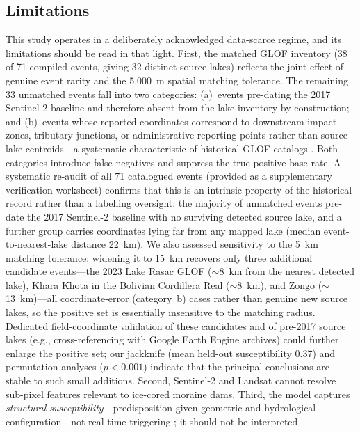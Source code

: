 \documentclass[pdflatex,sn-basic]{sn-jnl}%
\begin{document}
\subsection{Limitations}\label{sec:limitations}

This study operates in a deliberately acknowledged data-scarce regime,
and its limitations should be read in that light. First, the matched
GLOF inventory (38 of 71 compiled events, giving 32 distinct source
lakes) reflects the joint effect of genuine event rarity and the
5{,}000~m spatial matching tolerance. The remaining 33 unmatched events
fall into two categories: (a)~events pre-dating the 2017 Sentinel-2
baseline and therefore absent from the lake inventory by construction;
and (b)~events whose reported coordinates correspond to downstream
impact zones, tributary junctions, or administrative reporting points
rather than source-lake centroids---a systematic characteristic of
historical GLOF catalogs \citep{Lutzow2023,Allen2022}. Both categories
introduce false negatives and suppress the true positive base rate.
A systematic re-audit of all 71 catalogued events (provided as a
supplementary verification worksheet) confirms that this is an intrinsic
property of the historical record rather than a labelling oversight: the
majority of unmatched events pre-date the 2017 Sentinel-2 baseline with
no surviving detected source lake, and a further group carries
coordinates lying far from any mapped lake (median event-to-nearest-lake
distance 22~km). We also assessed sensitivity to the 5~km matching
tolerance: widening it to 15~km recovers only three additional candidate
events---the 2023 Lake Rasac GLOF \citep{Emmer2025} ($\sim$8~km from the
nearest detected lake), Khara Khota in the Bolivian Cordillera Real
($\sim$8~km), and Zongo ($\sim$13~km)---all coordinate-error
(category~b) cases rather than genuine new source lakes, so the positive
set is essentially insensitive to the matching radius. Dedicated
field-coordinate validation of these candidates and of pre-2017 source
lakes (e.g., cross-referencing with Google Earth Engine
\citep{Gorelick2017} archives) could further enlarge the positive set;
our jackknife (mean held-out susceptibility 0.37) and permutation
analyses ($p<0.001$) indicate that the principal conclusions are stable to
such small additions. Second, Sentinel-2 and Landsat cannot
resolve sub-pixel features relevant to ice-cored moraine dams.
Third, the model captures \textit{structural susceptibility}---predisposition
given geometric and hydrological configuration---not real-time
triggering \citep{Emmer2022,GAPHAZ2017}; it should not be interpreted
\end{document}
